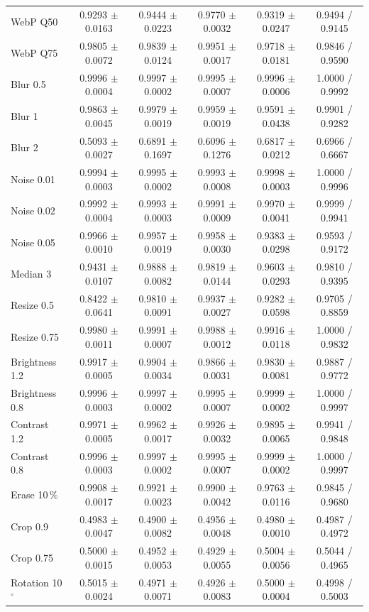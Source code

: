 \begin{table}[ht]
\begin{tabular}{lccccc}
WebP Q50 & 0.9293 $\pm$ 0.0163 & 0.9444 $\pm$ 0.0223 & 0.9770 $\pm$ 0.0032 & 0.9319 $\pm$ 0.0247 & 0.9494 / 0.9145 \\
WebP Q75 & 0.9805 $\pm$ 0.0072 & 0.9839 $\pm$ 0.0124 & 0.9951 $\pm$ 0.0017 & 0.9718 $\pm$ 0.0181 & 0.9846 / 0.9590 \\
Blur 0.5 & 0.9996 $\pm$ 0.0004 & 0.9997 $\pm$ 0.0002 & 0.9995 $\pm$ 0.0007 & 0.9996 $\pm$ 0.0006 & 1.0000 / 0.9992 \\
Blur 1 & 0.9863 $\pm$ 0.0045 & 0.9979 $\pm$ 0.0019 & 0.9959 $\pm$ 0.0019 & 0.9591 $\pm$ 0.0438 & 0.9901 / 0.9282 \\
Blur 2 & 0.5093 $\pm$ 0.0027 & 0.6891 $\pm$ 0.1697 & 0.6096 $\pm$ 0.1276 & 0.6817 $\pm$ 0.0212 & 0.6966 / 0.6667 \\
Noise 0.01 & 0.9994 $\pm$ 0.0003 & 0.9995 $\pm$ 0.0002 & 0.9993 $\pm$ 0.0008 & 0.9998 $\pm$ 0.0003 & 1.0000 / 0.9996 \\
Noise 0.02 & 0.9992 $\pm$ 0.0004 & 0.9993 $\pm$ 0.0003 & 0.9991 $\pm$ 0.0009 & 0.9970 $\pm$ 0.0041 & 0.9999 / 0.9941 \\
Noise 0.05 & 0.9966 $\pm$ 0.0010 & 0.9957 $\pm$ 0.0019 & 0.9958 $\pm$ 0.0030 & 0.9383 $\pm$ 0.0298 & 0.9593 / 0.9172 \\
Median 3 & 0.9431 $\pm$ 0.0107 & 0.9888 $\pm$ 0.0082 & 0.9819 $\pm$ 0.0144 & 0.9603 $\pm$ 0.0293 & 0.9810 / 0.9395 \\
Resize 0.5 & 0.8422 $\pm$ 0.0641 & 0.9810 $\pm$ 0.0091 & 0.9937 $\pm$ 0.0027 & 0.9282 $\pm$ 0.0598 & 0.9705 / 0.8859 \\
Resize 0.75 & 0.9980 $\pm$ 0.0011 & 0.9991 $\pm$ 0.0007 & 0.9988 $\pm$ 0.0012 & 0.9916 $\pm$ 0.0118 & 1.0000 / 0.9832 \\
Brightness 1.2 & 0.9917 $\pm$ 0.0005 & 0.9904 $\pm$ 0.0034 & 0.9866 $\pm$ 0.0031 & 0.9830 $\pm$ 0.0081 & 0.9887 / 0.9772 \\
Brightness 0.8 & 0.9996 $\pm$ 0.0003 & 0.9997 $\pm$ 0.0002 & 0.9995 $\pm$ 0.0007 & 0.9999 $\pm$ 0.0002 & 1.0000 / 0.9997 \\
Contrast 1.2 & 0.9971 $\pm$ 0.0005 & 0.9962 $\pm$ 0.0017 & 0.9926 $\pm$ 0.0032 & 0.9895 $\pm$ 0.0065 & 0.9941 / 0.9848 \\
Contrast 0.8 & 0.9996 $\pm$ 0.0003 & 0.9997 $\pm$ 0.0002 & 0.9995 $\pm$ 0.0007 & 0.9999 $\pm$ 0.0002 & 1.0000 / 0.9997 \\
Erase 10\,\% & 0.9908 $\pm$ 0.0017 & 0.9921 $\pm$ 0.0023 & 0.9900 $\pm$ 0.0042 & 0.9763 $\pm$ 0.0116 & 0.9845 / 0.9680 \\
Crop 0.9 & 0.4983 $\pm$ 0.0047 & 0.4900 $\pm$ 0.0082 & 0.4956 $\pm$ 0.0048 & 0.4980 $\pm$ 0.0010 & 0.4987 / 0.4972 \\
Crop 0.75 & 0.5000 $\pm$ 0.0015 & 0.4952 $\pm$ 0.0053 & 0.4929 $\pm$ 0.0055 & 0.5004 $\pm$ 0.0056 & 0.5044 / 0.4965 \\
Rotation 10$^\circ$ & 0.5015 $\pm$ 0.0024 & 0.4971 $\pm$ 0.0071 & 0.4926 $\pm$ 0.0083 & 0.5000 $\pm$ 0.0004 & 0.4998 / 0.5003 \\
\bottomrule
\end{tabular}
\end{table}
